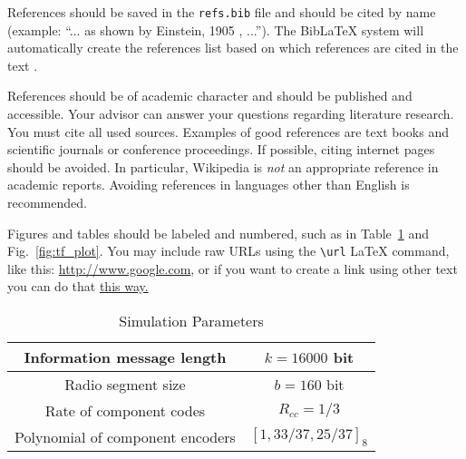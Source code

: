 \documentclass[journal, a4paper]{IEEEtran}
\begin{document}

	References should be saved in the {\tt refs.bib} file and should be cited by name (example: ``... as shown by Einstein, 1905 \parencite{einstein}, ...''). The BibLaTeX system will automatically create the references list based on which references are cited in the text \parencite{dirac}.

	References should be of academic character and should be published and accessible. Your advisor can answer your questions regarding literature research. You must cite all used sources.	Examples of good references are text books and scientific journals or conference proceedings.	If possible, citing internet pages should be avoided. In particular, Wikipedia is \emph{not} an appropriate reference in academic reports. Avoiding references in languages other than English is recommended.


	Figures and tables should be labeled and numbered, such as in Table~\ref{tab:simParameters} and Fig.~\ref{fig:tf_plot}. You may include raw URLs using the \texttt{\textbackslash url} \LaTeX{} command, like this: \url{http://www.google.com}, or if you want to create a link using other text you can do that \href{https://www.google.com}{this way.}


	\begin{table}[h!bt]
		\begin{center}
		\caption{Simulation Parameters}
		\label{tab:simParameters}
		\begin{tabular}{|c|c|}
			\hline
			Information message length & $k=16000$ bit \\
			\hline
			Radio segment size & $b=160$ bit \\
			\hline
			Rate of component codes & $R_{cc}=1/3$\\
			\hline
			Polynomial of component encoders & $[1 , 33/37 , 25/37]_8$\\
			\hline
		\end{tabular}
		\end{center}
	\end{table}
\end{document}
